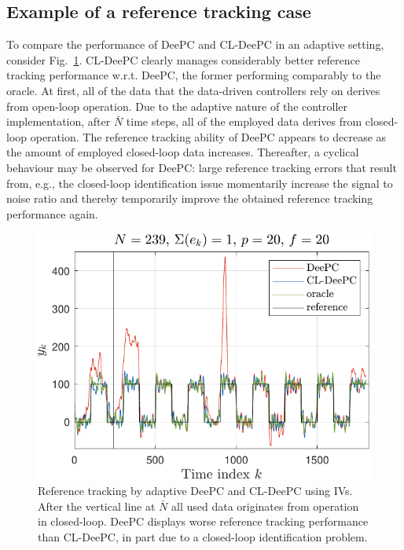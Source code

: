 \subsection{Example of a reference tracking case}
\noindent To compare the performance of \ac{DeePC} and \ac{CL-DeePC} in an adaptive setting, consider Fig.~\ref{fig:CL_Problem_Solution}. \ac{CL-DeePC} clearly manages considerably better reference tracking performance w.r.t. \ac{DeePC}, the former performing comparably to the oracle. At first, all of the data that the data-driven controllers rely on derives from open-loop operation. Due to the adaptive nature of the controller implementation, after $\bar{N}$ time steps, all of the employed data derives from closed-loop operation. The reference tracking ability of \ac{DeePC} appears to decrease as the amount of employed closed-loop data increases. Thereafter, a cyclical behaviour may be observed for \ac{DeePC}: large reference tracking errors that result from, e.g., the closed-loop identification issue momentarily increase the signal to noise ratio and thereby temporarily improve the obtained reference tracking performance again.
\begin{figure}[t!]
\begin{center}%
\includegraphics[width=\columnwidth]{results/figures/DeePC_CL_ID_issue_Re_1_Nbar_239_p_20_f_20_Ru_1_Rdu_0_Q_100_R_0_dR_10.pdf}    %
\caption{Reference tracking by adaptive \ac{DeePC} and \ac{CL-DeePC} using \ac{IVs}. After the vertical line at $\bar{N}$ all used data originates from operation in closed-loop. \ac{DeePC} displays worse reference tracking performance than \ac{CL-DeePC}, in part due to a closed-loop identification problem.}%
\label{fig:CL_Problem_Solution}%
\end{center}%
\end{figure}%

